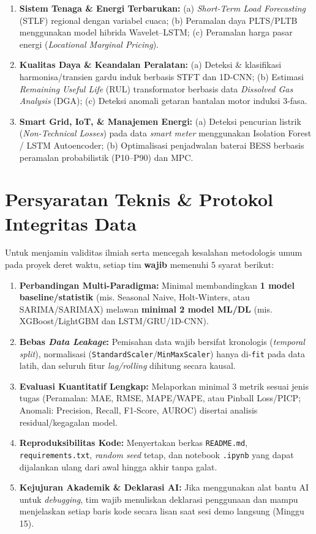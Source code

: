 \documentclass[11pt,a4paper]{article}
\begin{document}
\begin{enumerate}[label=\textbf{\arabic*.}, leftmargin=1.5em, itemsep=4pt]
    \item \textbf{Sistem Tenaga \& Energi Terbarukan:} (a) \textit{Short-Term Load Forecasting} (STLF) regional dengan variabel cuaca; (b) Peramalan daya PLTS/PLTB menggunakan model hibrida Wavelet--LSTM; (c) Peramalan harga pasar energi (\textit{Locational Marginal Pricing}).
    \item \textbf{Kualitas Daya \& Keandalan Peralatan:} (a) Deteksi \& klasifikasi harmonisa/transien gardu induk berbasis STFT dan 1D-CNN; (b) Estimasi \textit{Remaining Useful Life} (RUL) transformator berbasis data \textit{Dissolved Gas Analysis} (DGA); (c) Deteksi anomali getaran bantalan motor induksi 3-fasa.
    \item \textbf{Smart Grid, IoT, \& Manajemen Energi:} (a) Deteksi pencurian listrik (\textit{Non-Technical Losses}) pada data \textit{smart meter} menggunakan Isolation Forest / LSTM Autoencoder; (b) Optimalisasi penjadwalan baterai BESS berbasis peramalan probabilistik (P10--P90) dan MPC.
\end{enumerate}

\section{Persyaratan Teknis \& Protokol Integritas Data}

Untuk menjamin validitas ilmiah serta mencegah kesalahan metodologis umum pada proyek deret waktu, setiap tim \textbf{wajib} memenuhi 5 syarat berikut:
\begin{enumerate}[label=\textbf{\arabic*.}, leftmargin=1.5em, itemsep=3pt]
    \item \textbf{Perbandingan Multi-Paradigma:} Minimal membandingkan \textbf{1 model baseline/statistik} (mis. Seasonal Naive, Holt-Winters, atau SARIMA/SARIMAX) melawan \textbf{minimal 2 model ML/DL} (mis. XGBoost/LightGBM dan LSTM/GRU/1D-CNN).
    \item \textbf{Bebas \textit{Data Leakage}:} Pemisahan data wajib bersifat kronologis (\textit{temporal split}), normalisasi (\texttt{StandardScaler}/\texttt{MinMaxScaler}) hanya di-\texttt{fit} pada data latih, dan seluruh fitur \textit{lag/rolling} dihitung secara kausal.
    \item \textbf{Evaluasi Kuantitatif Lengkap:} Melaporkan minimal 3 metrik sesuai jenis tugas (Peramalan: MAE, RMSE, MAPE/WAPE, atau Pinball Loss/PICP; Anomali: Precision, Recall, F1-Score, AUROC) disertai analisis residual/kegagalan model.
    \item \textbf{Reproduksibilitas Kode:} Menyertakan berkas \texttt{README.md}, \texttt{requirements.txt}, \textit{random seed} tetap, dan notebook \texttt{.ipynb} yang dapat dijalankan ulang dari awal hingga akhir tanpa galat.
    \item \textbf{Kejujuran Akademik \& Deklarasi AI:} Jika menggunakan alat bantu AI untuk \textit{debugging}, tim wajib menuliskan deklarasi penggunaan dan mampu menjelaskan setiap baris kode secara lisan saat sesi demo langsung (Minggu 15).
\end{enumerate}
\end{document}
